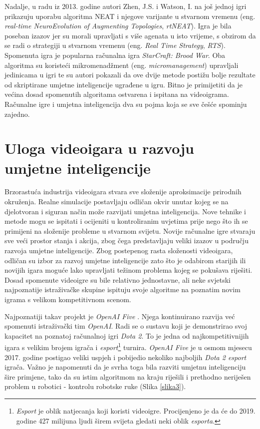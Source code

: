 \documentclass[times, utf8, diplomski, numeric]{fer}
\begin{document}
Nadalje, u radu \citep{rad6} iz 2013. godine autori Zhen, J.S. i Watson, I. na još jednoj igri prikazuju uporabu algoritma NEAT i njegove varijante u stvarnom vremenu (eng. \textit{real-time NeuroEvolution of Augmenting Topologies}, \textit{rtNEAT}). Igra je bila poseban izazov jer su morali upravljati s više agenata u isto vrijeme, s obzirom da se radi o strategiji u stvarnom vremenu (eng. \textit{Real Time Strategy}, \textit{RTS}). Spomenuta igra je popularna računalna igra \textit{StarCraft: Brood War}. Oba algoritma su koristeći mikromenadžment (eng. \textit{micromanagement}) upravljali jedinicama u igri te su autori pokazali da ove dvije metode postižu bolje rezultate od skriptirane umjetne inteligencije ugrađene u igru. Bitno je primijetiti da je većina dosad spomenutih algoritama ostvarena i ispitana na videoigrama. Računalne igre i umjetna inteligencija dva su pojma koja se sve češće spominju zajedno.

\section{Uloga videoigara u razvoju umjetne inteligencije}
Brzorastuća industrija videoigara stvara sve složenije aproksimacije prirodnih okruženja. Realne simulacije postavljaju odličan okvir unutar kojeg se na djelotvoran i siguran način može razvijati umjetna inteligencija. Nove tehnike i metode mogu se ispitati i ocijeniti u kontroliranim uvjetima prije nego što ih se primijeni na složenije probleme u stvarnom svijetu. Novije računalne igre stvaraju sve veći prostor stanja i akcija, zbog čega predstavljaju veliki izazov u području razvoja umjetne inteligencije. Zbog postepenog rasta složenosti videoigara, odličan su izbor za razvoj umjetne inteligencije zato što je odabirom starijih ili novijih igara moguće lako upravljati težinom problema kojeg se pokušava riješiti. Dosad spomenute videoigre su bile relativno jednostavne, ali neke svjetski najpoznatije istraživačke skupine ispituju svoje algoritme na poznatim novim igrama s velikom kompetitivnom scenom.

Najpoznatiji takav projekt je \textit{OpenAI Five} \citep{rad7}. Njega kontinuirano razvija već spomenuti istraživački tim \textit{OpenAI}. Radi se o sustavu koji je demonstrirao svoj kapacitet na poznatoj računalnoj igri \textit{Dota 2}. To je jedna od najkompetitivnijih igara s velikim brojem igrača i \textit{esport}\footnote{\textit{Esport} je oblik natjecanja koji koristi videoigre. Procijenjeno je da će do 2019. godine 427 milijuna ljudi širem svijeta gledati neki oblik \textit{esporta}.} turnira. \textit{OpenAI Five} je u osmom mjesecu 2017. godine postigao veliki uspjeh i pobijedio nekoliko najboljih \textit{Dota 2 esport} igrača. Važno je napomenuti da je svrha toga bila razviti umjetnu inteligenciju šire primjene, tako da su istim algoritmom na kraju riješili i prethodno neriješen problem u robotici - kontrolu robotske ruke (Slika \ref{slika3}).
\end{document}
